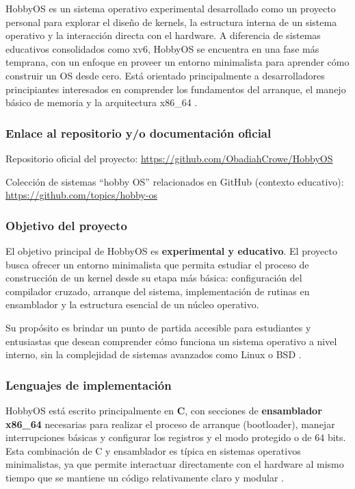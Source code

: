 HobbyOS es un sistema operativo experimental desarrollado como un proyecto personal para explorar el diseño de kernels, la estructura interna de un sistema operativo y la interacción directa con el hardware. A diferencia de sistemas educativos consolidados como xv6, HobbyOS se encuentra en una fase más temprana, con un enfoque en proveer un entorno minimalista para aprender cómo construir un OS desde cero. Está orientado principalmente a desarrolladores principiantes interesados en comprender los fundamentos del arranque, el manejo básico de memoria y la arquitectura x86\_64 \cite{hobbyos_repo, hobbyos_topics}.

\subsubsection{Enlace al repositorio y/o documentación oficial}

Repositorio oficial del proyecto:  
\url{https://github.com/ObadiahCrowe/HobbyOS}

Colección de sistemas “hobby OS” relacionados en GitHub (contexto educativo):  
\url{https://github.com/topics/hobby-os}

\subsubsection{Objetivo del proyecto}

El objetivo principal de HobbyOS es \textbf{experimental y educativo}. El proyecto busca ofrecer un entorno minimalista que permita estudiar el proceso de construcción de un kernel desde su etapa más básica: configuración del compilador cruzado, arranque del sistema, implementación de rutinas en ensamblador y la estructura esencial de un núcleo operativo.

Su propósito es brindar un punto de partida accesible para estudiantes y entusiastas que desean comprender cómo funciona un sistema operativo a nivel interno, sin la complejidad de sistemas avanzados como Linux o BSD \cite{hobbyos_repo}.

\subsubsection{Lenguajes de implementación}

HobbyOS está escrito principalmente en \textbf{C}, con secciones de \textbf{ensamblador x86\_64} necesarias para realizar el proceso de arranque (bootloader), manejar interrupciones básicas y configurar los registros y el modo protegido o de 64 bits. Esta combinación de C y ensamblador es típica en sistemas operativos minimalistas, ya que permite interactuar directamente con el hardware al mismo tiempo que se mantiene un código relativamente claro y modular \cite{hobbyos_repo}.

